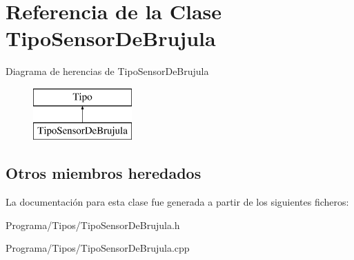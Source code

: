 \hypertarget{class_tipo_sensor_de_brujula}{\section{Referencia de la Clase Tipo\-Sensor\-De\-Brujula}
\label{class_tipo_sensor_de_brujula}
}
Diagrama de herencias de Tipo\-Sensor\-De\-Brujula\begin{figure}[H]
\begin{center}
\leavevmode
\includegraphics[height=2.000000cm]{class_tipo_sensor_de_brujula}
\end{center}
\end{figure}
\subsection*{Otros miembros heredados}


La documentación para esta clase fue generada a partir de los siguientes ficheros\-:\begin{DoxyCompactItemize}
\item 
Programa/\-Tipos/Tipo\-Sensor\-De\-Brujula.\-h\item 
Programa/\-Tipos/Tipo\-Sensor\-De\-Brujula.\-cpp\end{DoxyCompactItemize}
